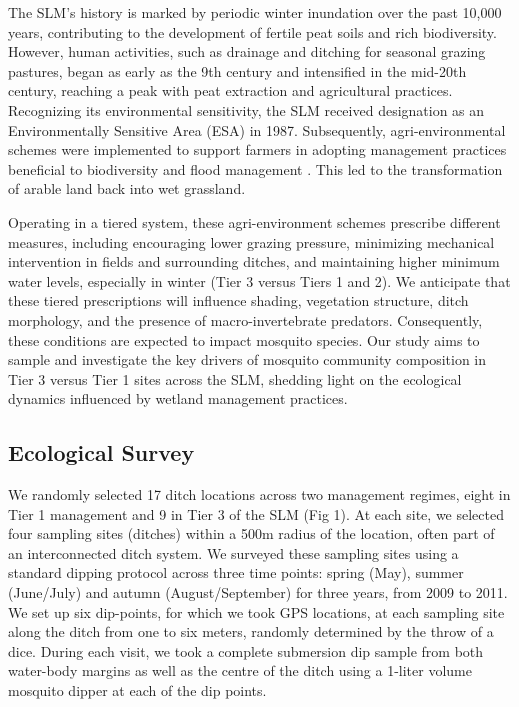 \documentclass[lineno,sn-basic]{sn-jnl}%
\begin{document}
The SLM's history is marked by periodic winter inundation over the past 10,000 years, contributing to the development of fertile peat soils and rich biodiversity. However, human activities, such as drainage and ditching for seasonal grazing pastures, began as early as the 9th century and intensified in the mid-20th century, reaching a peak with peat extraction and agricultural practices. Recognizing its environmental sensitivity, the SLM received designation as an Environmentally Sensitive Area (ESA) in 1987. Subsequently, agri-environmental schemes were implemented to support farmers in adopting management practices beneficial to biodiversity and flood management \citep{morrisEconomicDimensionsIntegrating2008}. This led to the transformation of arable land back into wet grassland.

Operating in a tiered system, these agri-environment schemes prescribe different measures, including encouraging lower grazing pressure, minimizing mechanical intervention in fields and surrounding ditches, and maintaining higher minimum water levels, especially in winter (Tier 3 versus Tiers 1 and 2). We anticipate that these tiered prescriptions will influence shading, vegetation structure, ditch morphology, and the presence of macro-invertebrate predators. Consequently, these conditions are expected to impact mosquito species. Our study aims to sample and investigate the key drivers of mosquito community composition in Tier 3 versus Tier 1 sites across the SLM, shedding light on the ecological dynamics influenced by wetland management practices.

\subsection{Ecological Survey}\label{subsec2}

We randomly selected 17 ditch locations across two management regimes, eight in Tier 1 management and 9 in Tier 3 of the SLM (Fig 1). At each site, we selected four sampling sites (ditches) within a 500m radius of the location, often part of an interconnected ditch system. We surveyed these sampling sites using a standard dipping protocol across three time points: spring (May), summer (June/July) and autumn (August/September) for three years, from 2009 to 2011. We set up six dip-points, for which we took GPS locations, at each sampling site along the ditch from one to six meters, randomly determined by the throw of a dice.  During each visit, we took a complete submersion dip sample from both water-body margins as well as the centre of the ditch using a 1-liter volume mosquito dipper at each of the dip points. 
\end{document}
